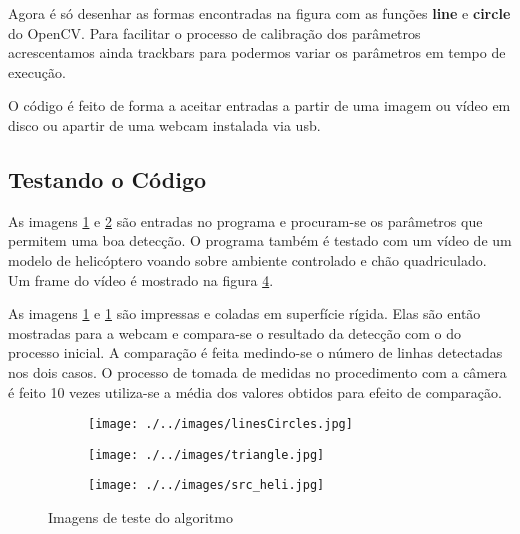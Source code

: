 \documentclass[journal]{IEEEtran}
\begin{document}
Agora é só desenhar as formas encontradas na figura com 
as funções \textbf{line} e \textbf{circle} do OpenCV. Para
facilitar o processo de calibração dos parâmetros acrescentamos ainda trackbars para podermos variar
os parâmetros em tempo de execução.

O código é feito de forma a aceitar entradas a partir de uma
imagem ou vídeo em disco ou apartir de uma webcam 
instalada via usb.

\subsection{Testando o Código}
As imagens \ref{fig:src-lines-circles} e \ref{fig:src-triangle} são entradas no programa e 
procuram-se os parâmetros que permitem uma boa detecção. O programa também é testado
com um vídeo de um modelo de helicóptero voando sobre ambiente controlado e chão
quadriculado. Um frame do vídeo é mostrado na figura \ref{fig:src-heli}.

As imagens \ref{fig:src-lines-circles} e \ref{fig:src-lines-circles} são impressas
e coladas em superfície rígida. Elas são então mostradas para a webcam e
compara-se o resultado da detecção com o do processo inicial. A comparação 
é feita medindo-se o número de linhas detectadas nos dois casos. O processo
de tomada de medidas no procedimento com a câmera é feito 10 vezes utiliza-se
a média dos valores obtidos para efeito de comparação.
\FloatBarrier
\begin{figure}[!htp]
	\begin{subfigure}[!htp]{0.5\textwidth}
		\centering
		\texttt{[image: ./../images/linesCircles.jpg]}
		\caption{}
		\label{fig:src-lines-circles}
	\end{subfigure}
	\begin{subfigure}[!htp]{0.5\textwidth}
		\centering		
		\texttt{[image: ./../images/triangle.jpg]}
		\caption{}
		\label{fig:src-triangle}
	\end{subfigure}
	\begin{subfigure}[!htp]{0.5\textwidth}
		\centering		
		\texttt{[image: ./../images/src\_heli.jpg]}
		\caption{}
		\label{fig:src-heli}
	\end{subfigure}
	\caption{Imagens de teste do algoritmo}
\end{figure}
\FloatBarrier	
\end{document}
